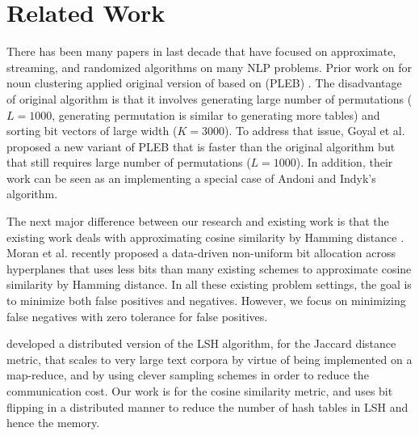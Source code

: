 
\section{Related Work}

There has been many papers in last decade that have focused on 
approximate, streaming, and randomized algorithms on many NLP problems. 
Prior work on \lsh for noun clustering \cite{ravichandran05} applied 
original version of \lsh based on \plebf (PLEB) \cite{Indyk98STOC,Charikar02STOC}. 
The disadvantage of original \lsh algorithm is that it involves generating large number of permutations ($L=1000$, 
generating permutation is similar to generating more tables)
and sorting bit vectors of large width ($K=3000$). 
To address that issue, Goyal et al. \cite{goyal12Flag} proposed a new variant of PLEB that
is faster than the original \lsh algorithm but that still requires large number of permutations 
($L=1000$). In addition, their work can be seen as an implementing a special case of Andoni and Indyk's \lsh algorithm.  

The next major difference between our research and existing work is that the 
existing work deals with approximating cosine similarity by Hamming distance  
\cite{ravichandran05,vandurme-lall:2010:Short,vandurme-lall:2011:Short,goyal12Flag,moranACL13}. Moran et al.  recently proposed a data-driven non-uniform bit allocation across hyperplanes that uses less bits than many existing \lsh schemes to approximate cosine similarity by Hamming distance.     
In all these existing problem settings, the goal is to minimize both false positives and negatives. However, we focus on minimizing false negatives with zero tolerance for false positives.

\cite{zadeh2013dimension} developed a distributed version of the LSH algorithm, for 
the Jaccard distance metric, that scales to very large text corpora by virtue of being implemented on a map-reduce, 
and by using clever sampling schemes in order to reduce the communication cost. Our work is for the cosine similarity metric, 
and uses bit flipping in a distributed manner to reduce the number of hash tables in LSH and hence the memory. 
